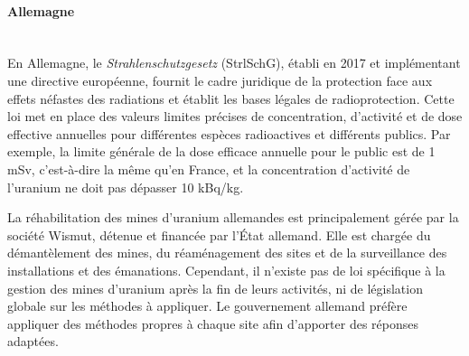 \documentclass{article}
\begin{document}
\paragraph{Allemagne \\ \\}

En Allemagne, le \emph{Strahlenschutzgesetz} (StrlSchG), établi en 2017 et implémentant une directive européenne, fournit le cadre juridique de la protection face aux effets néfastes des radiations et établit les bases légales de radioprotection.
Cette loi met en place des valeurs limites précises de concentration, d’activité et de dose effective annuelles pour différentes espèces radioactives et différents publics. Par exemple, la limite générale de la dose efficace annuelle pour le public est de 1 mSv, c'est-à-dire la même qu'en France, et la concentration d’activité de l’uranium ne doit pas dépasser 10 kBq/kg.

La réhabilitation des mines d’uranium allemandes est principalement gérée par la société Wismut, détenue et financée par l'État allemand. Elle est chargée du démantèlement des mines, du réaménagement des sites et de la surveillance des installations et des émanations.
Cependant, il n’existe pas de loi spécifique à la gestion des mines d’uranium après la fin de leurs activités, ni de législation globale sur les méthodes à appliquer. Le gouvernement allemand préfère appliquer des méthodes propres à chaque site afin d’apporter des réponses adaptées.
\end{document}
